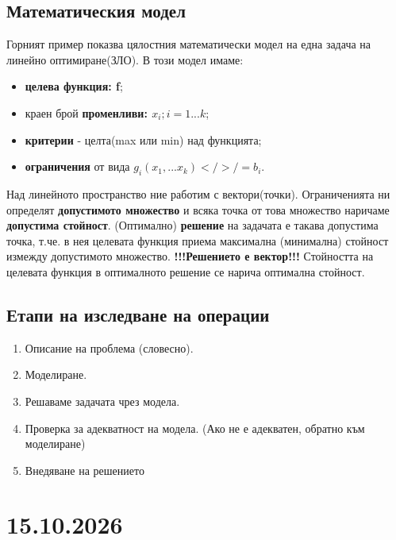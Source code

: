 \documentclass[12pt, a4paper]{article}
\begin{document}
\subsection*{Математическия модел}
Горният пример показва цялостния математически модел на една задача на линейно оптимиране(ЗЛО). В този модел имаме:
\begin{itemize}
\item \textbf{целева функция: f};
\item краен брой \textbf{променливи: $x_i; i = 1...k$};
\item \textbf{критерии} - целта(max или min) над функцията;
\item \textbf{ограничения} от вида $g_i(x_1, ... x_k) </>/= b_i$. 
\end{itemize}
Над линейното пространство ние работим с вектори(точки). Ограниченията ни определят \textbf{допустимото множество} и всяка точка от това множество наричаме \textbf{допустима стойност}. (Оптимално) \textbf{решение} на задачата е такава допустима точка, т.че. в нея целевата функция приема максимална (минимална) стойност измежду допустимото множество. \textbf{!!!Решението е вектор!!!} Стойността на целевата функция в оптималното решение се нарича оптимална стойност.
\subsection*{Етапи на изследване на операции}
\begin{enumerate}
	\item Описание на проблема (словесно).
	\item Моделиране.
	\item Решаваме задачата чрез модела.
	\item Проверка за адекватност на модела. (Ако не е адекватен, обратно към моделиране)
	\item Внедяване на решението
\end{enumerate}

{\centering\section*{15.10.2026}}
\end{document}
